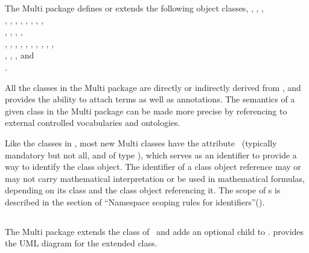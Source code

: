 The Multi package defines or extends the following object classes, \ExModel, \ListOfSpeciesTypes, \ExCompartment,\\ \ListOfCompartmentReferences, \CompartmentReference, \SpeciesType, \ListOfSpeciesTypeInstances, \ListOfSpeciesFeatureTypes, \ListOfInSpeciesTypeBonds, \ListOfSpeciesTypeComponentIndexes, \SpeciesFeatureType,\\
\ListOfPossibleSpeciesFeatureValues, \PossibleSpeciesFeatureValue, \SpeciesTypeInstance, \InSpeciesTypeBond, \\ \SpeciesTypeComponentIndex, \ExSpecies, \ListOfOutwardBindingSites, \ListOfSpeciesFeatures, \SubListOfSpeciesFeatures, \OutwardBindingSite, \SpeciesFeature, \ListOfSpeciesFeatureValues, \SpeciesFeatureValue, \ExReaction, \\ \ExSimpleSpeciesReference, \ExSpeciesReference, \ListOfSpeciesTypeComponentMapsInProduct, and \\ \SpeciesTypeComponentMapInProduct.  

All the classes in the Multi package are directly or indirectly derived from \SBase, and \SBase provides the ability to attach  terms as well as  annotations. The semantics of a given class in the Multi package can be made more precise by referencing to external controlled vocabularies and ontologies.

Like the classes in \SbmlLevelThreeCore, most new Multi classes have the attribute \idAtt\ (typically mandatory but not all, and of type \SIdPT), which serves as an identifier to provide a way to identify the class object. The identifier of a class object reference may or may not carry  mathematical interpretation or be used in mathematical formulas, depending on its class and the class object referencing it. The scope of \idAtt s is described in the section of ``Namespace scoping rules for identifiers''(). 

\clearpage

\subsection{\Model}
\label{def:Model}

The Multi package extends the \Model class of \SbmlLevelThreeCore\ and adds an optional \ListOfSpeciesTypes child to \ExModel.  provides the UML diagram for the extended \ExModel class.


